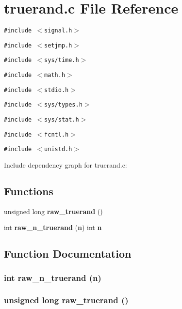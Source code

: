 \section{truerand.c File Reference}
\label{truerand_8c}


{\tt \#include $<$signal.h$>$}\par
{\tt \#include $<$setjmp.h$>$}\par
{\tt \#include $<$sys/time.h$>$}\par
{\tt \#include $<$math.h$>$}\par
{\tt \#include $<$stdio.h$>$}\par
{\tt \#include $<$sys/types.h$>$}\par
{\tt \#include $<$sys/stat.h$>$}\par
{\tt \#include $<$fcntl.h$>$}\par
{\tt \#include $<$unistd.h$>$}\par


Include dependency graph for truerand.c:\subsection*{Functions}
\begin{CompactItemize}
\item 
unsigned long {\bf raw\_\-truerand} ()
\item 
int {\bf raw\_\-n\_\-truerand} ({\bf n}) int {\bf n}
\end{CompactItemize}


\subsection{Function Documentation}
\subsubsection{\setlength{\rightskip}{0pt plus 5cm}int raw\_\-n\_\-truerand ({\bf n})}\label{truerand_8c_a8}


\subsubsection{\setlength{\rightskip}{0pt plus 5cm}unsigned long raw\_\-truerand ()}\label{truerand_8c_a7}




